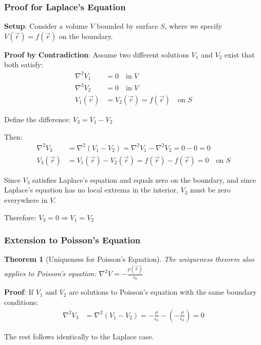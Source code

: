 \documentclass{article}
\newtheorem{theorem}{Theorem}[subsection]
\begin{document}
\subsubsection{Proof for Laplace's Equation}

\textbf{Setup}: Consider a volume $V$ bounded by surface $S$, where we specify $V(\vec{r}) = f(\vec{r})$ on the boundary.

\textbf{Proof by Contradiction}:
Assume two different solutions $V_1$ and $V_2$ exist that both satisfy:
\begin{align*}
    \nabla^2 V_1 &= 0 \quad \text{in } V \\
    \nabla^2 V_2 &= 0 \quad \text{in } V \\
    V_1(\vec{r}) &= V_2(\vec{r}) = f(\vec{r}) \quad \text{on } S
\end{align*}

Define the difference: $V_3 = V_1 - V_2$

Then:
\begin{align*}
    \nabla^2 V_3 &= \nabla^2(V_1 - V_2) = \nabla^2 V_1 - \nabla^2 V_2 = 0 - 0 = 0 \\
    V_3(\vec{r}) &= V_1(\vec{r}) - V_2(\vec{r}) = f(\vec{r}) - f(\vec{r}) = 0 \quad \text{on } S
\end{align*}

Since $V_3$ satisfies Laplace's equation and equals zero on the boundary, and since Laplace's equation has no local extrema in the interior, $V_3$ must be zero everywhere in $V$.

Therefore: $V_3 = 0 \Rightarrow V_1 = V_2$

\subsubsection{Extension to Poisson's Equation}

\begin{theorem}[Uniqueness for Poisson's Equation]
The uniqueness theorem also applies to Poisson's equation: $\nabla^2 V = -\frac{\rho(\vec{r})}{\epsilon_0}$
\end{theorem}

\textbf{Proof}: If $V_1$ and $V_2$ are solutions to Poisson's equation with the same boundary conditions:
\begin{align*}
    \nabla^2 V_3 &= \nabla^2(V_1 - V_2) = -\frac{\rho}{\epsilon_0} - \left(-\frac{\rho}{\epsilon_0}\right) = 0
\end{align*}

The rest follows identically to the Laplace case.
\end{document}
